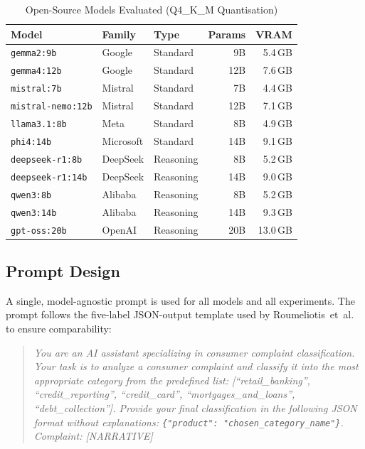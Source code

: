 \documentclass[a4paper,fleqn]{cas-dc}
\begin{document}
\begin{table}[!t]
  \renewcommand{\arraystretch}{1.2}
  \caption{Open-Source Models Evaluated (Q4\_K\_M Quantisation)}
  \label{tab:models}
  \centering
  \footnotesize
  \setlength{\tabcolsep}{4pt}
  \begin{tabular}{@{}lllrr@{}}
    \toprule
    \textbf{Model} & \textbf{Family} & \textbf{Type} & \textbf{Params} & \textbf{VRAM} \\
    \midrule
    \texttt{gemma2:9b}         & Google     & Standard  & 9B   & 5.4\,GB \\
    \texttt{gemma4:12b}        & Google     & Standard  & 12B  & 7.6\,GB \\
    \texttt{mistral:7b}        & Mistral    & Standard  & 7B   & 4.4\,GB \\
    \texttt{mistral-nemo:12b}  & Mistral    & Standard  & 12B  & 7.1\,GB \\
    \texttt{llama3.1:8b}       & Meta       & Standard  & 8B   & 4.9\,GB \\
    \texttt{phi4:14b}          & Microsoft  & Standard  & 14B  & 9.1\,GB \\
    \midrule
    \texttt{deepseek-r1:8b}    & DeepSeek   & Reasoning & 8B   & 5.2\,GB \\
    \texttt{deepseek-r1:14b}   & DeepSeek   & Reasoning & 14B  & 9.0\,GB \\
    \texttt{qwen3:8b}          & Alibaba    & Reasoning & 8B   & 5.2\,GB \\
    \texttt{qwen3:14b}         & Alibaba    & Reasoning & 14B  & 9.3\,GB \\
    \texttt{gpt-oss:20b}       & OpenAI     & Reasoning & 20B  & 13.0\,GB \\
    \bottomrule
  \end{tabular}
\end{table}

\subsection{Prompt Design}

A single, model-agnostic prompt is used for all models and all
experiments. The prompt follows the five-label JSON-output template
used by Roumeliotis~et~al.\ \cite{roumeliotis2025think} to ensure
comparability:

\begin{quote}
\textit{You are an AI assistant specializing in consumer complaint
classification. Your task is to analyze a consumer complaint and
classify it into the most appropriate category from the predefined
list: [``retail\_banking'', ``credit\_reporting'', ``credit\_card'',
``mortgages\_and\_loans'', ``debt\_collection'']. Provide your final
classification in the following JSON format without explanations:
\texttt{\{"product": "chosen\_category\_name"\}}. Complaint: [NARRATIVE]}
\end{quote}
\end{document}
